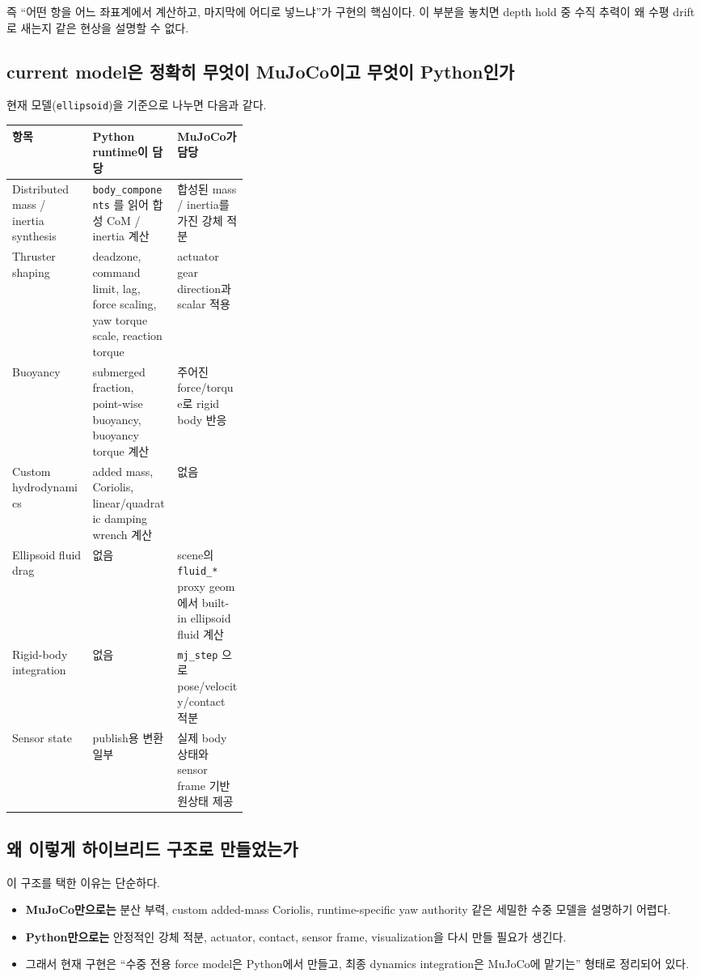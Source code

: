 \documentclass[11pt,a4paper]{article}
\newcommand{\code}[1]{\nolinkurl{#1}}
\begin{document}
즉 ``어떤 항을 어느 좌표계에서 계산하고, 마지막에 어디로 넣느냐''가 구현의 핵심이다. 이 부분을 놓치면 depth hold 중 수직 추력이 왜 수평 drift로 새는지 같은 현상을 설명할 수 없다.

\subsection{current model은 정확히 무엇이 MuJoCo이고 무엇이 Python인가}

현재 모델(\code{ellipsoid})을 기준으로 나누면 다음과 같다.

\begin{center}
\small
\begin{tabularx}{\linewidth}{>{\raggedright\arraybackslash}p{0.34\linewidth}YY}
\toprule
항목 & Python runtime이 담당 & MuJoCo가 담당 \\
\midrule
Distributed mass / inertia synthesis & \code{body\_components} 를 읽어 합성 CoM / inertia 계산 & 합성된 mass / inertia를 가진 강체 적분 \\
Thruster shaping & deadzone, command limit, lag, force scaling, yaw torque scale, reaction torque & actuator gear direction과 scalar 적용 \\
Buoyancy & submerged fraction, point-wise buoyancy, buoyancy torque 계산 & 주어진 force/torque로 rigid body 반응 \\
Custom hydrodynamics & added mass, Coriolis, linear/quadratic damping wrench 계산 & 없음 \\
Ellipsoid fluid drag & 없음 & scene의 \code{fluid\_*} proxy geom에서 built-in ellipsoid fluid 계산 \\
Rigid-body integration & 없음 & \code{mj\_step} 으로 pose/velocity/contact 적분 \\
Sensor state & publish용 변환 일부 & 실제 body 상태와 sensor frame 기반 원상태 제공 \\
\bottomrule
\end{tabularx}
\end{center}

\subsection{왜 이렇게 하이브리드 구조로 만들었는가}

이 구조를 택한 이유는 단순하다.

\begin{itemize}[leftmargin=2em]
  \item \textbf{MuJoCo만으로는} 분산 부력, custom added-mass Coriolis, runtime-specific yaw authority 같은 세밀한 수중 모델을 설명하기 어렵다.
  \item \textbf{Python만으로는} 안정적인 강체 적분, actuator, contact, sensor frame, visualization을 다시 만들 필요가 생긴다.
  \item 그래서 현재 구현은 ``수중 전용 force model은 Python에서 만들고, 최종 dynamics integration은 MuJoCo에 맡기는'' 형태로 정리되어 있다.
\end{itemize}
\end{document}

